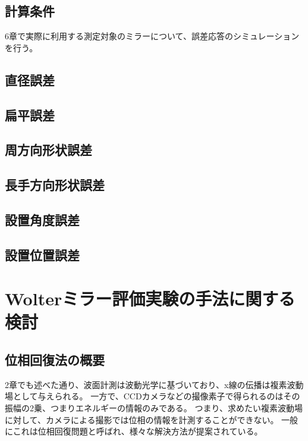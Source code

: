 \documentclass[dvipdfmx,autodetect-engine]{jreport}
\begin{document}
\section{計算条件}
6章で実際に利用する測定対象のミラーについて、誤差応答のシミュレーションを行う。


\section{直径誤差}

\section{扁平誤差}

\section{周方向形状誤差}

\section{長手方向形状誤差}

\section{設置角度誤差}

\section{設置位置誤差}

\newpage
\chapter{Wolterミラー評価実験の手法に関する検討}
\minitoc

\newpage
\section{位相回復法の概要}
2章でも述べた通り、波面計測は波動光学に基づいており、x線の伝播は複素波動場として与えられる。
一方で、CCDカメラなどの撮像素子で得られるのはその振幅の2乗、つまりエネルギーの情報のみである。
つまり、求めたい複素波動場に対して、カメラによる撮影では位相の情報を計測することができない。
一般にこれは位相回復問題と呼ばれ、様々な解決方法が提案されている。
\end{document}
